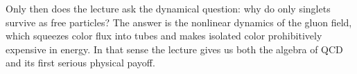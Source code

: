 Only then does the lecture ask the dynamical question: why do only singlets survive as free particles? The answer is the nonlinear dynamics of the gluon field, which squeezes color flux into tubes and makes isolated color prohibitively expensive in energy. In that sense the lecture gives us both the algebra of QCD and its first serious physical payoff.